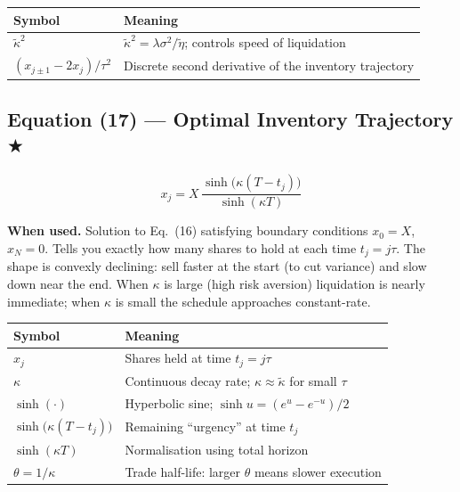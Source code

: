 \documentclass[11pt,a4paper]{article}
\begin{document}
\begin{center}
\begin{tabular}{@{}L{3.5cm}L{10cm}@{}}
\toprule
\textbf{Symbol} & \textbf{Meaning} \\
\midrule
$\tilde{\kappa}^2$ & $\tilde{\kappa}^2 = \lambda\sigma^2/\tilde{\eta}$; controls speed of liquidation \\
$(x_{j\pm1}-2x_j)/\tau^2$ & Discrete second derivative of the inventory trajectory \\
\bottomrule
\end{tabular}
\end{center}

\subsection*{Equation (17) — Optimal Inventory Trajectory \texorpdfstring{$\bigstar$}{}}

\begin{equation}
  x_j = X\,\frac{\sinh\!\bigl(\kappa(T-t_j)\bigr)}{\sinh(\kappa T)}
\end{equation}

\textbf{When used.} Solution to Eq.~(16) satisfying boundary conditions $x_0=X$,
$x_N=0$.  Tells you exactly how many shares to hold at each time $t_j = j\tau$.  The
shape is convexly declining: sell faster at the start (to cut variance) and slow down near
the end.  When $\kappa$ is large (high risk aversion) liquidation is nearly immediate;
when $\kappa$ is small the schedule approaches constant-rate.

\begin{center}
\begin{tabular}{@{}L{3.5cm}L{10cm}@{}}
\toprule
\textbf{Symbol} & \textbf{Meaning} \\
\midrule
$x_j$ & Shares held at time $t_j = j\tau$ \\
$\kappa$ & Continuous decay rate; $\kappa\approx\tilde{\kappa}$ for small $\tau$ \\
$\sinh(\cdot)$ & Hyperbolic sine; $\sinh u = (e^u - e^{-u})/2$ \\
$\sinh\!\bigl(\kappa(T-t_j)\bigr)$ & Remaining ``urgency'' at time $t_j$ \\
$\sinh(\kappa T)$ & Normalisation using total horizon \\
$\theta = 1/\kappa$ & Trade half-life: larger $\theta$ means slower execution \\
\bottomrule
\end{tabular}
\end{center}
\end{document}
